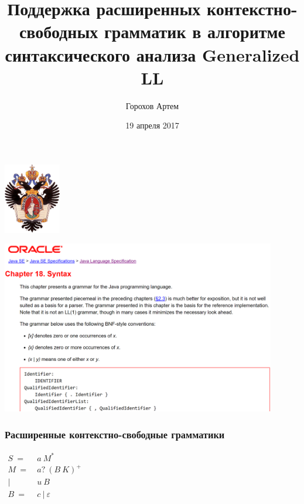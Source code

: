 \documentclass{beamer}
\title[]{Поддержка расширенных контекстно-свободных грамматик в алгоритме синтаксического анализа Generalized LL}
\institute[СПбГУ]{ Санкт-Петербургский Государственный Университет }
\author[Горохоа Артем]{Горохов Артем}
\date{19 апреля 2017}
\begin{document}
 
	
	
	\begin{frame}
		\begin{center} 
			{\includegraphics[width=2.5cm]{pictures/SPbGU_Logo.png}} 
		\end{center}
		\titlepage
	\end{frame}

	\begin{frame}
		\begin{center} 
			{\includegraphics[width=12cm]{pictures/java_grammar.png}} 
		\end{center}
	\end{frame}

	\begin{frame} 
		\frametitle{Расширенные контекстно-свободные грамматики}
		\begin{center}
			{$\begin{aligned}
				S\ =&\ a\ M^* \\
				M\ =&\ a?\ (B\ K)^+ \\
				|&\ u\ B \\
				B\ =&\ c\ |\ \varepsilon
				\end{aligned}$}
		\end{center}
	\end{frame}
	
\end{document}
